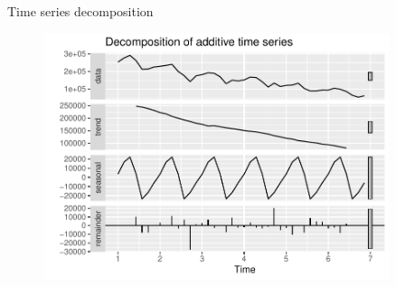 \documentclass{beamer}
\begin{document}


\begin{frame}{Time series decomposition \cite{Hyndman-et-al-2018}}
\begin{figure}
\includegraphics[width=0.9\textwidth]{Plots/United States-tsdecompose.pdf}
\end{figure}
\end{frame}
\end{document}

